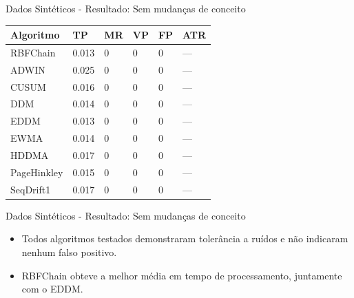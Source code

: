 \documentclass[10pt]{beamer}
\begin{document}
\begin{frame}{Dados Sintéticos - Resultado: Sem mudanças de conceito}
    \begin{table}[h]
        \centering
        \begin{tabular}{llllll}

        \toprule
        Algoritmo              & TP                     & MR                     & VP                     & FP                     & ATR                    \\
        \midrule
        RBFChain               & 0.013                  & 0                      & 0                      & 0                      & ---                    \\
        ADWIN                  & 0.025                  & 0                      & 0                      & 0                      & ---                    \\
        CUSUM                  & 0.016                  & 0                      & 0                      & 0                      & ---                    \\
        DDM                    & 0.014                  & 0                      & 0                      & 0                      & ---                    \\
        EDDM                   & 0.013                  & 0                      & 0                      & 0                      & ---                    \\
        EWMA                   & 0.014                  & 0                      & 0                      & 0                      & ---                    \\
        HDDMA                  & 0.017                  & 0                      & 0                      & 0                      & ---                    \\
        PageHinkley            & 0.015                  & 0                      & 0                      & 0                      & ---                    \\
        SeqDrift1              & 0.017                  & 0                      & 0                      & 0                      & ---                    \\
        \bottomrule

        \end{tabular}
    \end{table}
\end{frame}

\begin{frame}{Dados Sintéticos - Resultado: Sem mudanças de conceito}
    \begin{itemize}
        \item Todos algoritmos testados demonstraram tolerância a ruídos e não indicaram nenhum falso positivo.
        \item RBFChain obteve a melhor média em tempo de processamento, juntamente com o EDDM.
    \end{itemize}
\end{frame}
\end{document}
